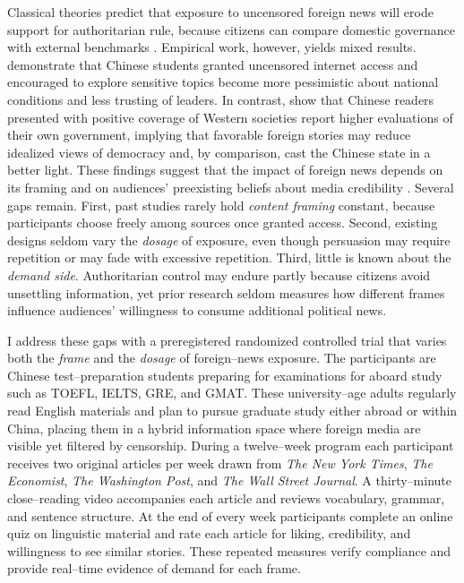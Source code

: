 \documentclass[12pt, american]{article}
\begin{document}
Classical theories predict that exposure to uncensored foreign news will erode support for authoritarian rule, because citizens can compare domestic governance with external benchmarks \citep{egorov2009resource, geddes1989sources}. Empirical work, however, yields mixed results. \citet{chen2019impact} demonstrate that Chinese students granted uncensored internet access and encouraged to explore sensitive topics become more pessimistic about national conditions and less trusting of leaders. In contrast, \citet{huang2019information} show that Chinese readers presented with positive coverage of Western societies report higher evaluations of their own government, implying that favorable foreign stories may reduce idealized views of democracy and, by comparison, cast the Chinese state in a better light. These findings suggest that the impact of foreign news depends on its framing and on audiences’ preexisting beliefs about media credibility \citep{stockmann2013media}. Several gaps remain. First, past studies rarely hold \textit{content framing} constant, because participants choose freely among sources once granted access. Second, existing designs seldom vary the \textit{dosage} of exposure, even though persuasion may require repetition or may fade with excessive repetition. Third, little is known about the \textit{demand side}. Authoritarian control may endure partly because citizens avoid unsettling information, yet prior research seldom measures how different frames influence audiences’ willingness to consume additional political news.

I address these gaps with a preregistered randomized controlled trial that varies both the \textit{frame} and the \textit{dosage} of foreign–news exposure. The participants are Chinese test–preparation students preparing for examinations for aboard study such as TOEFL, IELTS, GRE, and GMAT. These university–age adults regularly read English materials and plan to pursue graduate study either abroad or within China, placing them in a hybrid information space where foreign media are visible yet filtered by censorship. During a twelve–week program each participant receives two original articles per week drawn from \textit{The New York Times}, \textit{The Economist}, \textit{The Washington Post}, and \textit{The Wall Street Journal}. A thirty–minute close–reading video accompanies each article and reviews vocabulary, grammar, and sentence structure. At the end of every week participants complete an online quiz on linguistic material and rate each article for liking, credibility, and willingness to see similar stories. These repeated measures verify compliance and provide real–time evidence of demand for each frame.
\end{document}

